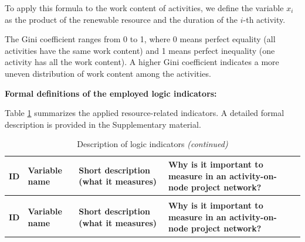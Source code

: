 \documentclass[preprint,
3p]{elsarticle} %
\begin{document}
\begin{appendices}
To apply this formula to the work content of activities, we define the
variable \(x_i\) as the product of the renewable resource and the
duration of the \(i\)-th activity.

The Gini coefficient ranges from 0 to 1, where 0 means perfect equality
(all activities have the same work content) and 1 means perfect
inequality (one activity has all the work content). A higher Gini
coefficient indicates a more uneven distribution of work content among
the activities.

\noindent \textbf{Formal definitions of the employed logic indicators:}

Table \ref{tab:DESCLOGRELIND} summarizes the applied resource-related
indicators. A detailed formal description is provided in the
Supplementary material.

\begingroup\fontsize{8}{10}\selectfont

\begin{longtable}[t]{l>{\raggedright\arraybackslash}p{2.2cm}>{\raggedright\arraybackslash}p{3.6cm}>{\raggedright\arraybackslash}p{3.6cm}}
\caption{\label{tab:DESCLOGRELIND}Description of logic indicators}\\
\toprule
\textbf{ID} & \textbf{Variable name} & \textbf{Short description (what it measures)} & \textbf{Why is it important to measure in an activity-on-node project network?}\\
\midrule
\endfirsthead
\caption[]{Description of logic indicators \textit{(continued)}}\\
\toprule
\textbf{ID} & \textbf{Variable name} & \textbf{Short description (what it measures)} & \textbf{Why is it important to measure in an activity-on-node project network?}\\
\midrule
\endhead


\end{longtable}
\end{appendices}
\end{document}
